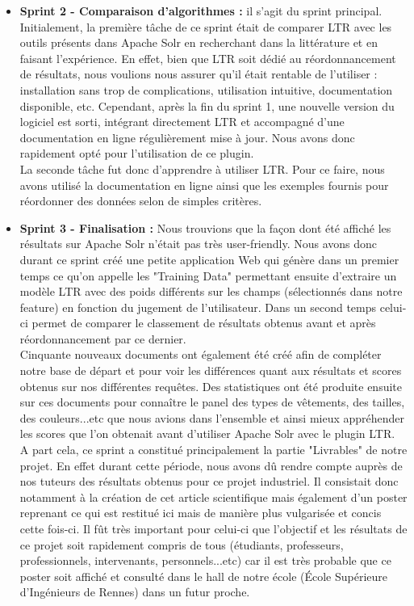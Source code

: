 \documentclass[twocolumn,a4paper]{IEEEtranfr}
\begin{document}
\begin{itemize}
  \item \textbf{Sprint 2 - Comparaison d'algorithmes :} il s'agit du sprint principal. Initialement, la première tâche de ce sprint était de comparer LTR avec les outils présents dans Apache Solr en recherchant dans la littérature et en faisant l'expérience. En effet, bien que LTR soit dédié au réordonnancement de résultats, nous voulions nous assurer qu'il était rentable de l'utiliser : installation sans trop de complications, utilisation intuitive, documentation disponible, etc. Cependant, après la fin du sprint 1, une nouvelle version du logiciel est sorti, intégrant directement LTR et accompagné d'une documentation en ligne régulièrement mise à jour. Nous avons donc rapidement opté pour l'utilisation de ce plugin.\\
  La seconde tâche fut donc d'apprendre à utiliser LTR. Pour ce faire, nous avons utilisé la documentation en ligne ainsi que les exemples fournis pour réordonner des données selon de simples critères.\\
  
  \item \textbf{Sprint 3 - Finalisation :} Nous trouvions que la façon dont été affiché les résultats sur Apache Solr n'était pas très user-friendly. Nous avons donc durant ce sprint créé une petite application Web qui génère dans un premier temps ce qu'on appelle les "Training Data" permettant ensuite d'extraire un modèle LTR avec des poids différents sur les champs (sélectionnés dans notre feature) en fonction du jugement de l'utilisateur. Dans un second temps celui-ci permet de comparer le classement de résultats obtenus avant et après réordonnancement par ce dernier.\\
  Cinquante nouveaux documents ont également été créé afin de compléter notre base de départ et pour voir les différences quant aux résultats et scores obtenus sur nos différentes requêtes. Des statistiques ont été produite ensuite sur ces documents pour connaître le panel des types de vêtements, des tailles, des couleurs...etc que nous avions dans l'ensemble et ainsi mieux appréhender les scores que l'on obtenait avant d'utiliser Apache Solr avec le plugin LTR.\\
  A part cela, ce sprint a constitué principalement la partie "Livrables" de notre projet. En effet durant cette période, nous avons dû rendre compte auprès de nos tuteurs des résultats obtenus pour ce projet industriel. Il consistait donc notamment à la création de cet article scientifique mais également d'un poster reprenant ce qui est restitué ici mais de manière plus vulgarisée et concis cette fois-ci. Il fût très important pour celui-ci que l'objectif et les résultats de ce projet soit rapidement compris de tous (étudiants, professeurs, professionnels, intervenants, personnels...etc) car il est très probable que ce poster soit affiché et consulté dans le hall de notre école (École Supérieure d'Ingénieurs de Rennes) dans un futur proche.\\
\end{itemize}
\end{document}
